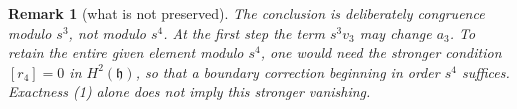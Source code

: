 \documentclass[11pt]{article}
\newtheorem{remark}[lemma]{Remark}
\begin{document}
\begin{remark}[what is not preserved]
The conclusion is deliberately congruence modulo $s^3$, not modulo $s^4$.
At the first step the term $s^3v_3$ may change $a_3$.  To retain the entire
given element modulo $s^4$, one would need the stronger condition
$[r_4]=0$ in $H^2(\mathfrak h)$, so that a boundary correction beginning in
order $s^4$ suffices.  Exactness (1) alone does not imply this stronger
vanishing.
\end{remark}
\end{document}
